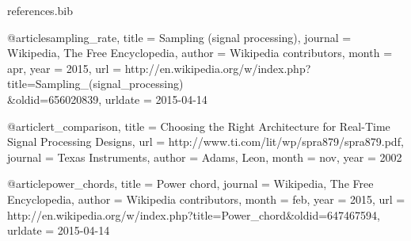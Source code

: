 \begin{filecontents*}{references.bib}

@article{sampling_rate,
	title = {Sampling (signal processing)},
	journal = {Wikipedia, The Free Encyclopedia},
	author = {Wikipedia contributors},
	month = apr,
	year = {2015},
	url = {http://en.wikipedia.org/w/index.php?title=Sampling\_(signal\_processing)\\\&oldid=656020839},
	urldate = {2015-04-14}
}

@article{rt_comparison,
	title = {Choosing the Right Architecture for Real-Time Signal Processing Designs},
	url = {http://www.ti.com/lit/wp/spra879/spra879.pdf},
	journal = {Texas Instruments},
	author = {Adams, Leon},
	month = nov,
	year = {2002}
}

@article{power_chords,
	title = {Power chord},
	journal = {Wikipedia, The Free Encyclopedia},
	author = {Wikipedia contributors},
	month = feb,
	year = {2015},
	url = {http://en.wikipedia.org/w/index.php?title=Power\_chord\&oldid=647467594},
	urldate = {2015-04-14}
}


\end{filecontents*}
